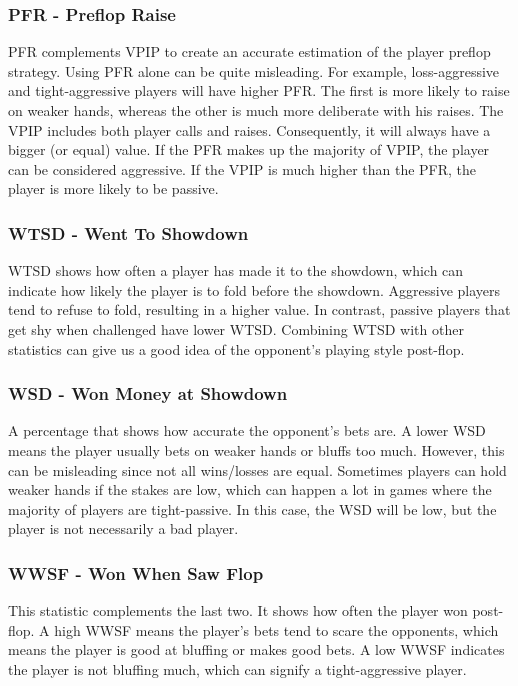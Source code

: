 \subsubsection{PFR - Preflop Raise}
PFR complements VPIP to create an accurate estimation of the player preflop strategy. Using PFR alone can be quite misleading. For example, loss-aggressive and tight-aggressive players will have higher PFR. The first is more likely to raise on weaker hands, whereas the other is much more deliberate with his raises. The VPIP includes both player calls and raises. Consequently, it will always have a bigger (or equal) value. If the PFR makes up the majority of VPIP, the player can be considered aggressive. If the VPIP is much higher than the PFR, the player is more likely to be passive.


\subsubsection{WTSD - Went To Showdown}
WTSD shows how often a player has made it to the showdown, which can indicate how likely the player is to fold before the showdown. Aggressive players tend to refuse to fold, resulting in a higher value. In contrast, passive players that get shy when challenged have lower WTSD. Combining WTSD with other statistics can give us a good idea of the opponent's playing style post-flop. 

\subsubsection{WSD - Won Money at Showdown}
A percentage that shows how accurate the opponent's bets are. A lower WSD means the player usually bets on weaker hands or bluffs too much. However, this can be misleading since not all wins/losses are equal. Sometimes players can hold weaker hands if the stakes are low, which can happen a lot in games where the majority of players are tight-passive. In this case, the WSD will be low, but the player is not necessarily a bad player. 

\subsubsection{WWSF - Won When Saw Flop}
This statistic complements the last two. It shows how often the player won post-flop. A high WWSF means the player's bets tend to scare the opponents, which means the player is good at bluffing or makes good bets. A low WWSF indicates the player is not bluffing much, which can signify a tight-aggressive player.

